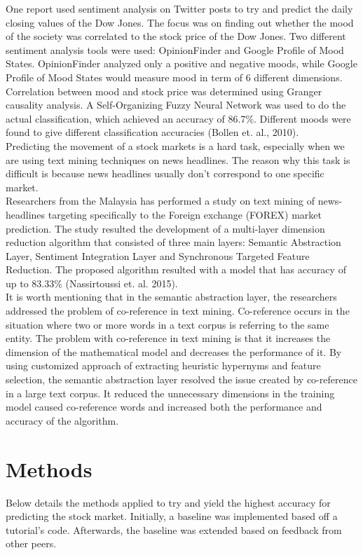 \documentclass[11pt,a4paper]{article}
\begin{document}
One report used sentiment analysis on Twitter posts to try and predict the daily closing values of the Dow Jones. The focus was on finding out whether the mood of the society was correlated to the stock price of the Dow Jones. Two different sentiment analysis tools were used: OpinionFinder and Google Profile of Mood States. OpinionFinder analyzed only a positive and negative moods, while Google Profile of Mood States would measure mood in term of 6 different dimensions. Correlation between mood and stock price was determined using Granger causality analysis. A Self-Organizing Fuzzy Neural Network was used to do the actual classification, which achieved an accuracy of 86.7\%. Different moods were found to give different classification accuracies (Bollen et. al., 2010).\\

Predicting the movement of a stock markets is a hard task, especially when we are using text mining techniques on news headlines. The reason why this task is difficult is because news headlines usually don’t correspond to one specific market.\\

Researchers from the Malaysia has performed a study on text mining of news-headlines targeting specifically to the Foreign exchange (FOREX) market prediction. The study resulted the development of a multi-layer dimension reduction algorithm that consisted of three main layers: Semantic Abstraction Layer, Sentiment Integration Layer and Synchronous Targeted Feature Reduction. The proposed algorithm resulted with a model that has accuracy of up to 83.33\% (Nassirtoussi et. al. 2015).\\

It is worth mentioning that in the semantic abstraction layer, the researchers addressed the problem of co-reference in text mining. Co-reference occurs in the situation where two or more words in a text corpus is referring to the same entity. The problem with co-reference in text mining is that it increases the dimension of the mathematical model and decreases the performance of it. By using customized approach of extracting heuristic hypernyms and feature selection, the semantic abstraction layer resolved the issue created by co-reference in a large text corpus. It reduced the unnecessary dimensions in the training model caused co-reference words and increased both the performance and accuracy of the algorithm.\\


\section{Methods}
Below details the methods applied to try and yield the highest accuracy for predicting the stock market. Initially, a baseline was implemented based off a tutorial's code. Afterwards, the baseline was extended based on feedback from other peers.\\
\end{document}
